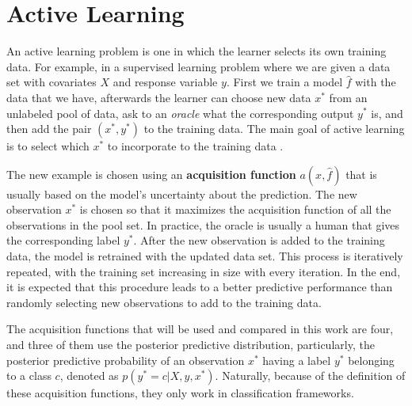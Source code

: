
\section{Active Learning}

An active learning problem is one in which the learner selects its own training data. For example, in a supervised learning problem where we are given a data set with covariates $X$ and response variable $y$. First we train a model $\hat{f}$ with the data that we have, afterwards the learner can choose new data $x^*$ from an unlabeled pool of data, ask to an \textit{oracle} what the corresponding output $y^*$ is, and then add the pair $(x^*, y^*)$ to the training data. The main goal of active learning is to select which $x^*$ to incorporate to the training data \cite{cohn1996active}.

The new example is chosen using an \textbf{acquisition function} $a(x, \hat{f})$ that is usually based on the model's uncertainty about the prediction. The new observation $x^*$ is chosen so that it maximizes the acquisition function of all the observations in the pool set. In practice, the oracle is usually a human that gives the corresponding label $y^*$. After the new observation is added to the training data, the model is retrained with the updated data set. This process is iteratively repeated, with the training set increasing in size with every iteration. In the end, it is expected that this procedure leads to a better predictive performance than randomly selecting new observations to add to the training data.

The acquisition functions that will be used and compared in this work are four, and three of them use the posterior predictive distribution, particularly, the posterior predictive probability of an observation $x^*$ having a label $y^*$ belonging to a class $c$, denoted as  $p(y^* = c | X, y, x^*)$. Naturally, because of the definition of these acquisition functions, they only work in classification frameworks.

